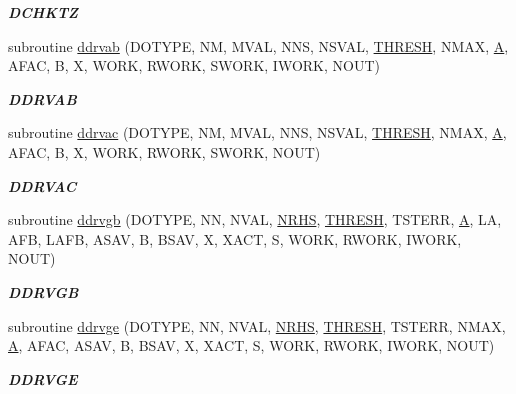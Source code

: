 \begin{DoxyCompactItemize}
\begin{DoxyCompactList}\small\item\em {\bfseries D\+C\+H\+K\+T\+Z} \end{DoxyCompactList}\item 
subroutine \hyperlink{group__double__lin_gab51d9b46e13d24b1f6d7c6d819a499f9}{ddrvab} (D\+O\+T\+Y\+P\+E, N\+M, M\+V\+A\+L, N\+N\+S, N\+S\+V\+A\+L, \hyperlink{zlaqgs_8c_a0656018abfc9fa2821827415f5d5ea57}{T\+H\+R\+E\+S\+H}, N\+M\+A\+X, \hyperlink{classA}{A}, A\+F\+A\+C, B, X, W\+O\+R\+K, R\+W\+O\+R\+K, S\+W\+O\+R\+K, I\+W\+O\+R\+K, N\+O\+U\+T)
\begin{DoxyCompactList}\small\item\em {\bfseries D\+D\+R\+V\+A\+B} \end{DoxyCompactList}\item 
subroutine \hyperlink{group__double__lin_ga6d2938fad84307e583e14592cfb1b739}{ddrvac} (D\+O\+T\+Y\+P\+E, N\+M, M\+V\+A\+L, N\+N\+S, N\+S\+V\+A\+L, \hyperlink{zlaqgs_8c_a0656018abfc9fa2821827415f5d5ea57}{T\+H\+R\+E\+S\+H}, N\+M\+A\+X, \hyperlink{classA}{A}, A\+F\+A\+C, B, X, W\+O\+R\+K, R\+W\+O\+R\+K, S\+W\+O\+R\+K, N\+O\+U\+T)
\begin{DoxyCompactList}\small\item\em {\bfseries D\+D\+R\+V\+A\+C} \end{DoxyCompactList}\item 
subroutine \hyperlink{group__double__lin_ga9d231df4eed62f16176a0b75835aa7d4}{ddrvgb} (D\+O\+T\+Y\+P\+E, N\+N, N\+V\+A\+L, \hyperlink{example__user_8c_aa0138da002ce2a90360df2f521eb3198}{N\+R\+H\+S}, \hyperlink{zlaqgs_8c_a0656018abfc9fa2821827415f5d5ea57}{T\+H\+R\+E\+S\+H}, T\+S\+T\+E\+R\+R, \hyperlink{classA}{A}, L\+A, A\+F\+B, L\+A\+F\+B, A\+S\+A\+V, B, B\+S\+A\+V, X, X\+A\+C\+T, S, W\+O\+R\+K, R\+W\+O\+R\+K, I\+W\+O\+R\+K, N\+O\+U\+T)
\begin{DoxyCompactList}\small\item\em {\bfseries D\+D\+R\+V\+G\+B} \end{DoxyCompactList}\item 
subroutine \hyperlink{group__double__lin_gada1dd4d154ef10330db7f861a4908f98}{ddrvge} (D\+O\+T\+Y\+P\+E, N\+N, N\+V\+A\+L, \hyperlink{example__user_8c_aa0138da002ce2a90360df2f521eb3198}{N\+R\+H\+S}, \hyperlink{zlaqgs_8c_a0656018abfc9fa2821827415f5d5ea57}{T\+H\+R\+E\+S\+H}, T\+S\+T\+E\+R\+R, N\+M\+A\+X, \hyperlink{classA}{A}, A\+F\+A\+C, A\+S\+A\+V, B, B\+S\+A\+V, X, X\+A\+C\+T, S, W\+O\+R\+K, R\+W\+O\+R\+K, I\+W\+O\+R\+K, N\+O\+U\+T)
\begin{DoxyCompactList}\small\item\em {\bfseries D\+D\+R\+V\+G\+E} \end{DoxyCompactList}\item 

\end{DoxyCompactItemize}
